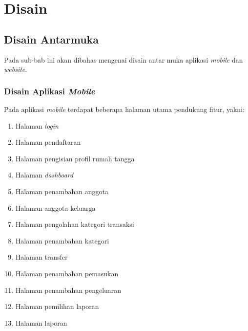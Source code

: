 \chapter{Disain}
\label{chap:disain}

\section{Disain Antarmuka}
\label{sec:disainantarmuka}

\hspace{0,5cm}Pada sub-bab ini akan dibahas mengenai disain antar muka aplikasi \textit{mobile} dan \textit{website}.

\subsection{Disain Aplikasi \textit{Mobile}}
\label{subsec:disainaplikasimobile}

\hspace{0,5cm}Pada aplikasi \textit{mobile} terdapat beberapa halaman utama pendukung fitur, yakni:
\begin{enumerate}
	\item Halaman \textit{login}
	\item	Halaman pendaftaran
	\item Halaman pengisian profil rumah tangga
	\item Halaman \textit{dashboard}
	\item Halaman penambahan anggota
	\item Halaman anggota keluarga
	\item Halaman pengolahan kategori transaksi
	\item Halaman penambahan kategori
	\item Halaman transfer
	\item Halaman penambahan pemasukan
	\item Halaman penambahan pengeluaran
	\item Halaman pemilihan laporan
	\item Halaman laporan
\end{enumerate}



